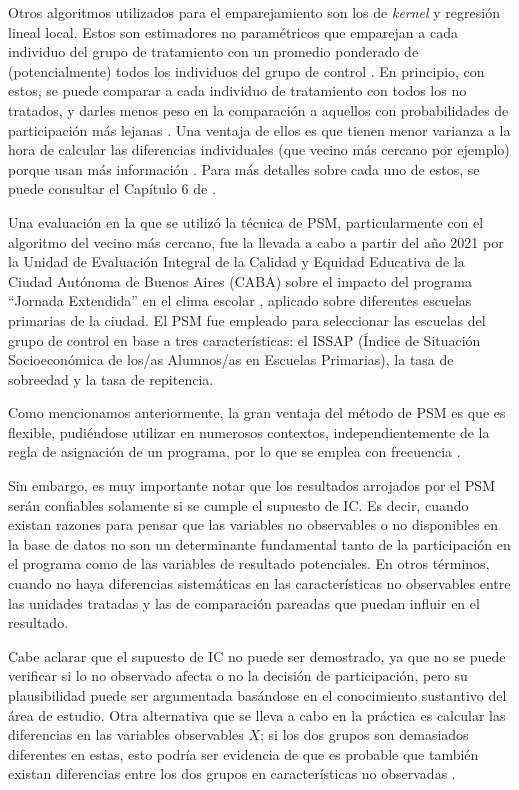\documentclass[../../main.tex]{subfiles}
\begin{document}
Otros algoritmos utilizados para el emparejamiento son los de \textit{kernel} y regresión
lineal local. Estos son estimadores no paramétricos que emparejan a cada individuo del
grupo de tratamiento con un promedio ponderado de (potencialmente) todos los individuos
del grupo de control \cite{bernal}. En principio, con estos, se puede comparar a cada
individuo de tratamiento con todos los no tratados, y darles menos peso en la comparación
a aquellos con probabilidades de participación más lejanas \cite{bernal}. Una ventaja de
ellos es que tienen menor varianza a la hora de calcular las diferencias individuales (que
vecino más cercano por ejemplo) porque usan más información \cite{bernal}. Para
más detalles sobre cada uno de estos, se puede consultar el Capítulo 6 de \cite{bernal}.

Una evaluación en la que se utilizó la técnica de PSM, particularmente con el algoritmo
del vecino más cercano, fue la llevada a cabo a partir del año 2021 por la Unidad de
Evaluación Integral de la Calidad y Equidad Educativa de la Ciudad Autónoma de Buenos
Aires (CABA) sobre el impacto del programa ``Jornada Extendida'' en el clima escolar
\cite{ueicee2023jornada}, aplicado sobre diferentes escuelas primarias de la ciudad. El
PSM fue empleado para seleccionar las escuelas del grupo de control en base a tres
características: el ISSAP (Índice de Situación Socioeconómica de los/as Alumnos/as en
Escuelas Primarias), la tasa de sobreedad y la tasa de repitencia.

Como mencionamos anteriormente, la gran ventaja del método de PSM es que es flexible,
pudiéndose utilizar en numerosos contextos, independientemente de la regla de asignación
de un programa, por lo que se emplea con frecuencia \cite{bernal}.

Sin embargo, es muy importante notar que los resultados arrojados por el PSM serán
confiables solamente si se cumple el supuesto de IC. Es decir, cuando existan razones para
pensar que las variables no observables o no disponibles en la base de datos no son un
determinante fundamental tanto de la participación en el programa como de las variables de
resultado potenciales. En otros términos, cuando no haya diferencias sistemáticas en las
características no observables entre las unidades tratadas y las de comparación pareadas
que puedan influir en el resultado.

Cabe aclarar que el supuesto de IC no puede ser demostrado, ya que no se puede verificar
si lo no observado afecta o no la decisión de participación, pero su plausibilidad puede
ser argumentada basándose en el conocimiento sustantivo del área de estudio. Otra
alternativa que se lleva a cabo en la práctica es calcular las diferencias en las
variables observables \(X\); si los dos grupos son demasiados diferentes en estas, esto
podría ser evidencia de que es probable que también existan diferencias entre los dos
grupos en características no observadas \cite{bernal}.
\end{document}

